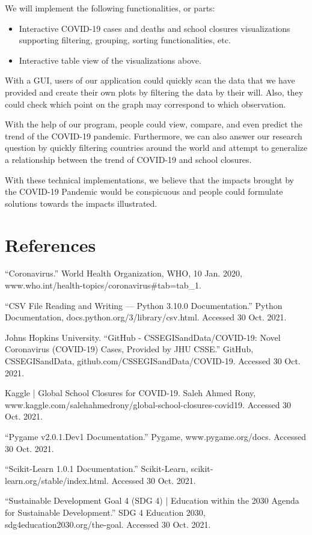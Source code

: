 \documentclass[fontsize=11pt]{article}
\begin{document}
We will implement the following functionalities, or parts:

\begin{itemize}
    \item
        Interactive COVID-19 cases and deaths and school closures visualizations supporting filtering, grouping, sorting functionalities, etc.

    \item
        Interactive table view of the visualizations above.
\end{itemize}

With a GUI, users of our application could quickly scan the data that we have provided and create their own plots by filtering the data by their will. Also, they could check which point on the graph may correspond to which observation.

With the help of our program, people could view, compare, and even predict the trend of the COVID-19 pandemic. Furthermore, we can also answer our research question by quickly filtering countries around the world and attempt to generalize a relationship between the trend of COVID-19 and school closures.

With these technical implementations, we believe that the impacts brought by the COVID-19 Pandemic would be conspicuous and people could formulate solutions towards the impacts illustrated.

\newpage

\section*{References}

“Coronavirus.” World Health Organization, WHO, 10 Jan. 2020, www.who.int/health-topics/coronavirus\#tab=tab\_1.

“CSV File Reading and Writing — Python 3.10.0 Documentation.” Python Documentation, docs.python.org/3/library/csv.html. Accessed 30 Oct. 2021.

Johns Hopkins University. “GitHub - CSSEGISandData/COVID-19: Novel Coronavirus (COVID-19) Cases, Provided by JHU CSSE.” GitHub, CSSEGISandData, github.com/CSSEGISandData/COVID-19. Accessed 30 Oct. 2021.

Kaggle | Global School Closures for COVID-19. Saleh Ahmed Rony, www.kaggle.com/salehahmedrony/global-school-closures-covid19. Accessed 30 Oct. 2021.

“Pygame v2.0.1.Dev1 Documentation.” Pygame, www.pygame.org/docs. Accessed 30 Oct. 2021.

“Scikit-Learn 1.0.1 Documentation.” Scikit-Learn, scikit-learn.org/stable/index.html. Accessed 30 Oct. 2021.

“Sustainable Development Goal 4 (SDG 4) | Education within the 2030 Agenda for Sustainable Development.” SDG 4 Education 2030, sdg4education2030.org/the-goal. Accessed 30 Oct. 2021.
\end{document}
